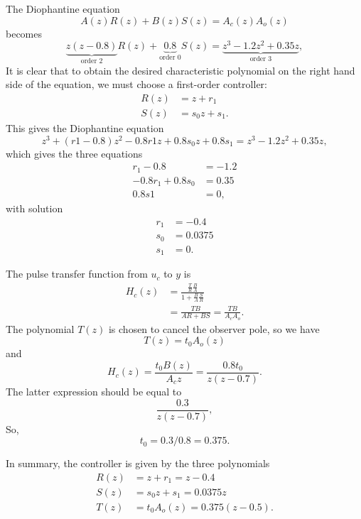\documentclass{scrartcl}
\begin{document}
The Diophantine equation
\[ A(z)R(z) + B(z)S(z) = A_c(z)A_o(z) \]
becomes
\[ \underbrace{z(z-0.8)}_{\text{order } 2}R(z) + \underbrace{0.8}_{\text{order } 0} S(z) = \underbrace{z^3-1.2z^2+0.35z }_{\text{order } 3}, \]
It is clear that to obtain the desired characteristic polynomial on the right hand side of the equation, we must choose a first-order controller:
\begin{align*}
R(z) &= z + r_1\\
S(z) &= s_0z + s_1.
\end{align*}
This gives the Diophantine equation
\[ z^3 + (r1 - 0.8)z^2 - 0.8r1z + 0.8s_0z + 0.8s_1 = z^3-1.2z^2+0.35z, \]
which gives the three equations 
\begin{align*}
r_1 -0.8 &= -1.2\\
-0.8r_1 + 0.8s_0 &= 0.35\\
0.8s1 &= 0,
\end{align*}
with solution
\begin{align*}
r_1  &= -0.4\\
s_0 &= 0.0375\\
s_1 &= 0.
\end{align*}

The pulse transfer function from \(u_c\) to \(y\) is 
\begin{equation*}
 \begin{split}
 H_c(z) &= \frac{\frac{T}{R}\frac{B}{A}}{1 + \frac{B}{A}\frac{S}{R}}\\
        &= \frac{TB}{AR+BS} = \frac{TB}{A_cA_o}.
 \end{split}
\end{equation*}
The polynomial \(T(z)\) is chosen to cancel the observer pole, so we have
\[ T(z) = t_0 A_o(z)\]
and
\[ H_c(z) = \frac{t_0B(z)}{A_c{z}} = \frac{0.8t_0}{z(z-0.7)}. \]
The  latter expression should be equal to 
\[ \frac{0.3}{z(z-0.7)}, \]
So,
\[t_0 = 0.3/0.8 = 0.375. \]

In summary, the controller is given by the three polynomials
\begin{align*}
R(z) &= z+r_1 = z-0.4\\
S(z) &= s_0z + s_1 = 0.0375z\\
T(z) &= t_0A_o(z) = 0.375(z - 0.5).
\end{align*}
\end{document}
